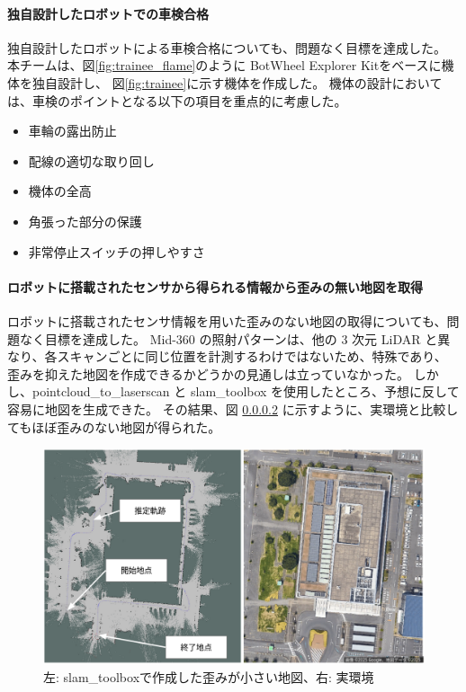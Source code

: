 \documentclass[twocolumn,9pt]{jsproceedings}
\begin{document}
\paragraph{独自設計したロボットでの車検合格}
独自設計したロボットによる車検合格についても、問題なく目標を達成した。
本チームは、図\ref{fig:trainee_flame}のように
BotWheel Explorer Kitをベースに機体を独自設計し、
図\ref{fig:trainee}に示す機体を作成した。
機体の設計においては、車検のポイントとなる以下の項目を重点的に考慮した。
\begin{itemize}
  \item 車輪の露出防止
  \item 配線の適切な取り回し
  \item 機体の全高
  \item 角張った部分の保護
  \item 非常停止スイッチの押しやすさ
\end{itemize}


\paragraph{ロボットに搭載されたセンサから得られる情報から歪みの無い地図を取得}

ロボットに搭載されたセンサ情報を用いた歪みのない地図の取得についても、問題なく目標を達成した。
Mid-360 の照射パターンは、他の 3 次元 LiDAR と異なり、各スキャンごとに同じ位置を計測するわけではないため、特殊であり、
歪みを抑えた地図を作成できるかどうかの見通しは立っていなかった。
しかし、pointcloud\_to\_laserscan と slam\_toolbox を使用したところ、予想に反して容易に地図を生成できた。
その結果、図 \ref{} に示すように、実環境と比較してもほぼ歪みのない地図が得られた。

\begin{figure}[h]
  \begin{center}
    \includegraphics[width=1.0\linewidth]{figs/map.pdf}
    \caption{左: slam\_toolboxで作成した歪みが小さい地図、右: 実環境}
    \label{fig:map}
  \end{center}
\end{figure}
\end{document}
